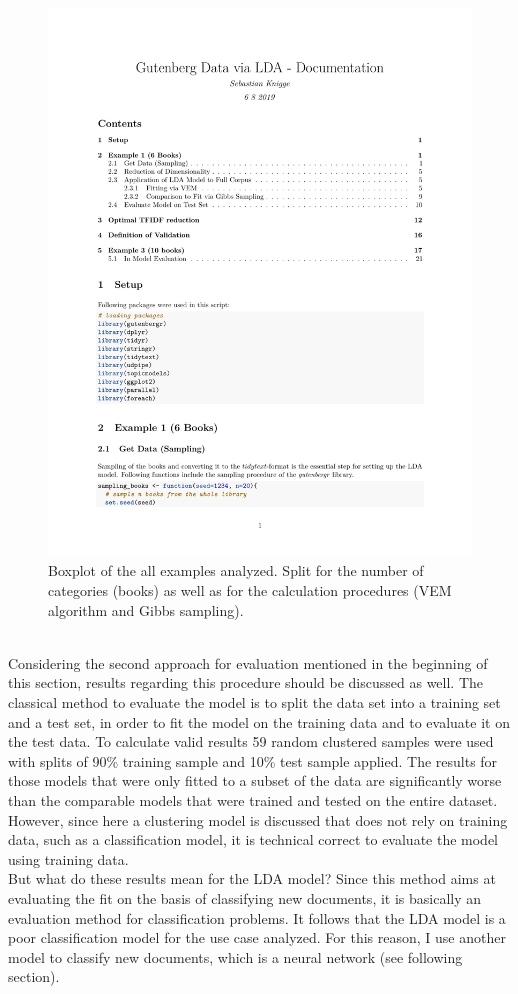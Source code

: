 \documentclass[11pt,a4paper]{article}
\begin{document}
\begin{figure}[h]
	\centering
	\includegraphics[page=22, trim=70 400 0 0,clip,width=1.2\textwidth]{LDA_Documentation.pdf}
	\caption{Boxplot of the all examples analyzed. Split for the number of categories (books) as well as for the calculation procedures (VEM algorithm and Gibbs sampling).}
	\label{fig:comparison_boxplot}
\end{figure}
\ \\
Considering the second approach for evaluation mentioned in the beginning of this section, results regarding this procedure should be discussed as well. The classical method to evaluate the model is to split the data set into a training set and a test set, in order to fit the model on the training data and to evaluate it on the test data. To calculate valid results 59 random clustered samples were used with splits of 90\% training sample and 10\% test sample applied. The results for those models that were only fitted to a subset of the data are significantly worse than the comparable models that were trained and tested on the entire dataset. However, since here a clustering model is discussed that does not rely on training data, such as a classification model, it is technical correct to evaluate the model using training data.\\
But what do these results mean for the LDA model? Since this method aims at evaluating the fit on the basis of classifying new documents, it is basically an evaluation method for classification problems. It follows that the LDA model is a poor classification model for the use case analyzed. For this reason, I use another model to classify new documents, which is a neural network (see following section).
\end{document}
